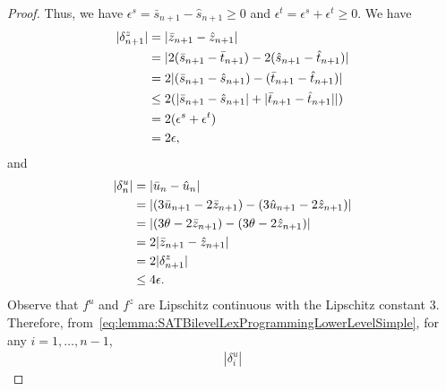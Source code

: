 \documentclass[runningheads,orivec]{llncs}
\newcommand{\MacroColor}[1]{#1}
\newcommand{\NVariables}{\MacroColor{n}}
\newcommand{\ReformZ}{\MacroColor{z}}
\newcommand{\LexUVar}{\MacroColor{\theta}}
\newcommand{\LexLVarS}{\MacroColor{s}}
\newcommand{\LexLVarT}{\MacroColor{t}}
\newcommand{\LexLVarU}{\MacroColor{u}}
\newcommand{\LexLVarFuncU}{\MacroColor{f^u}}
\newcommand{\LexLVarFuncZ}{\MacroColor{f^z}}
\begin{document}
\begin{appendix}
\begin{proof}
Thus, we have $\epsilon^{\LexLVarS} = \bar{\LexLVarS}_{\NVariables + 1} - \hat{\LexLVarS}_{\NVariables + 1} \ge 0$ and $\epsilon^{\LexLVarT} = \epsilon^{\LexLVarS} + \epsilon^{\LexLVarT} \ge 0$.
We have
\begin{align}
|\delta^{\ReformZ}_{\NVariables + 1}|
&=
|\bar{\ReformZ}_{\NVariables + 1} - \hat{\ReformZ}_{\NVariables + 1}|
\notag
\\
&=
|2 (\bar{\LexLVarS}_{\NVariables + 1} - \bar{\LexLVarT}_{\NVariables + 1}) - 2 (\hat{\LexLVarS}_{\NVariables + 1} - \hat{\LexLVarT}_{\NVariables + 1})|
\notag
\\
&=
2 |(\bar{\LexLVarS}_{\NVariables + 1} - \hat{\LexLVarS}_{\NVariables + 1}) - (\bar{\LexLVarT}_{\NVariables + 1} - \hat{\LexLVarT}_{\NVariables + 1})|
\notag
\\
&\le
2 (|\bar{\LexLVarS}_{\NVariables + 1} - \hat{\LexLVarS}_{\NVariables + 1}| + |\bar{\LexLVarT}_{\NVariables + 1} - \hat{\LexLVarT}_{\NVariables + 1}||)
\notag
\\
&=
2(\epsilon^{\LexLVarS} + \epsilon^{\LexLVarT})
\notag
\\
&= 2 \epsilon,
\label{eq:lemma:SATBilevelLexProgrammingLowerLevelZNPlus1}
\end{align}
and
\begin{align}
|\delta^{\LexLVarU}_{\NVariables}|
&=
|\bar{\LexLVarU}_{\NVariables} - \hat{\LexLVarU}_{\NVariables}|
\notag
\\
&=
| (3 \bar{\LexLVarU}_{\NVariables + 1} - 2 \bar{\ReformZ}_{\NVariables + 1}) - (3 \hat{\LexLVarU}_{\NVariables + 1} - 2 \hat{\ReformZ}_{\NVariables + 1}) |
\notag
\\
&=
| (3 \LexUVar - 2 \bar{\ReformZ}_{\NVariables + 1}) - (3 \LexUVar - 2 \hat{\ReformZ}_{\NVariables + 1}) |
\notag
\\
&=
2 | \bar{\ReformZ}_{\NVariables + 1} - \hat{\ReformZ}_{\NVariables + 1} |
\notag
\\
&=
2 |\delta^{\ReformZ}_{\NVariables + 1}|
\notag
\\
&\le 4 \epsilon.
\label{eq:lemma:SATBilevelLexProgrammingLowerLevelUNPlus1}
\end{align}
Observe that $\LexLVarFuncU$ and $\LexLVarFuncZ$ are Lipschitz continuous with the Lipschitz constant $3$.
Therefore, from~\eqref{eq:lemma:SATBilevelLexProgrammingLowerLevelSimple}, for any $i = 1, \ldots, \NVariables - 1$,
\begin{align}
|\delta^{\LexLVarU}_{i}|

\end{align}
\end{proof}
\end{appendix}
\end{document}
